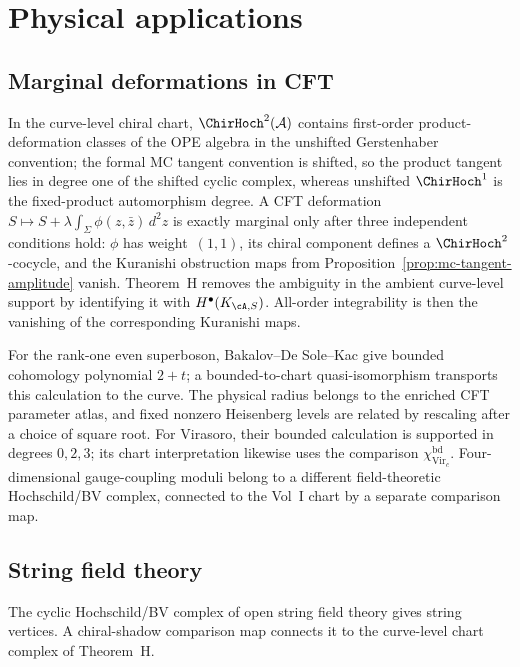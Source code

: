 \section{Physical applications}

\subsection{Marginal deformations in CFT}

In the curve-level chiral chart, $\ChirHoch^2(\mathcal{A})$ contains
first-order product-deformation classes of the OPE algebra in the
unshifted Gerstenhaber convention; the formal MC tangent convention is
shifted, so the product tangent lies in degree one of the shifted cyclic
complex, whereas unshifted $\ChirHoch^1$ is the fixed-product
automorphism degree. A CFT deformation
$S \mapsto S+\lambda\int_\Sigma\phi(z,\bar z)\,d^2z$ is exactly
marginal only after three independent conditions hold: $\phi$ has
weight~$(1,1)$, its chiral component defines a
$\ChirHoch^2$-cocycle, and the Kuranishi obstruction maps from
Proposition~\ref{prop:mc-tangent-amplitude} vanish. Theorem~H removes
the ambiguity in the ambient curve-level support by identifying it
with $H^\bullet(K_{\cA,S})$.  All-order integrability is then the
vanishing of the corresponding Kuranishi maps.

\begin{example}
For the rank-one even superboson, Bakalov--De Sole--Kac give bounded
cohomology polynomial $2+t$; a bounded-to-chart quasi-isomorphism
transports this calculation to the curve.  The physical radius belongs
to the enriched CFT parameter atlas, and fixed nonzero Heisenberg
levels are related by rescaling after a choice of square root.
For Virasoro, their bounded calculation is supported in degrees
$0,2,3$; its chart interpretation likewise uses the comparison
$\chi_{\operatorname{Vir}_c}^{\mathrm{bd}}$.
Four-dimensional
gauge-coupling moduli belong to a different field-theoretic
Hochschild/BV complex, connected to the Vol~I chart by a separate
comparison map.
\end{example}

\subsection{String field theory}

The cyclic Hochschild/BV complex of open string field theory gives
string vertices.  A chiral-shadow comparison map connects it to the
curve-level chart complex of Theorem~H.

